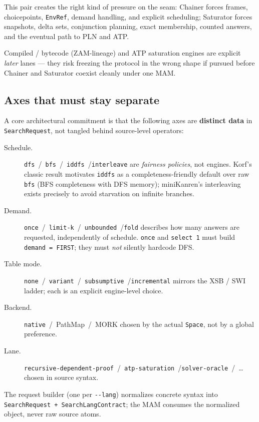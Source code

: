 \documentclass[11pt]{article}
\newcommand{\code}[1]{\texttt{#1}}
\newcommand{\PathMap}{\textup{PathMap}}
\begin{document}
This pair creates the right kind of pressure on the seam: Chainer
forces frames, choicepoints, \code{EnvRef}, demand handling, and
explicit scheduling; Saturator forces snapshots, delta sets,
conjunction planning, exact membership, counted answers, and the
eventual path to PLN and ATP.

Compiled / bytecode (ZAM-lineage) and ATP saturation engines are
explicit \emph{later} lanes --- they risk freezing the protocol in
the wrong shape if pursued before Chainer and Saturator coexist
cleanly under one MAM.

\subsection{Axes that must stay separate}

A core architectural commitment is that the following axes are
\textbf{distinct data} in \code{SearchRequest}, not tangled behind
source-level operators:

\begin{description}
\item[Schedule.]  \code{dfs}~/~\code{bfs}~/~\code{iddfs}~/\code{interleave}
  are \emph{fairness policies}, not engines.  Korf's classic result
  motivates \code{iddfs} as a completeness-friendly default over raw
  \code{bfs} (BFS completeness with DFS memory); miniKanren's
  interleaving exists precisely to avoid starvation on infinite
  branches.
\item[Demand.]  \code{once}~/~\code{limit-k}~/~\code{unbounded}~/\code{fold}
  describes how many answers are requested, independently of schedule.
  \code{once} and \code{select~1} must build \code{demand = FIRST};
  they must \emph{not} silently hardcode DFS.
\item[Table mode.]  \code{none}~/~\code{variant}~/~\code{subsumptive}~/\code{incremental}
  mirrors the XSB / SWI ladder; each is an explicit engine-level choice.
\item[Backend.]  \code{native}~/~\PathMap{}~/~MORK chosen by the
  actual \code{Space}, not by a global preference.
\item[Lane.]  \code{recursive-dependent-proof}~/~\code{atp-saturation}~/\code{solver-oracle}~/~\dots{}
  chosen in source syntax.
\end{description}

The request builder (one per \code{-{}-lang}) normalizes concrete syntax
into \code{SearchRequest~+~SearchLangContract}; the MAM consumes the
normalized object, never raw source atoms.
\end{document}
